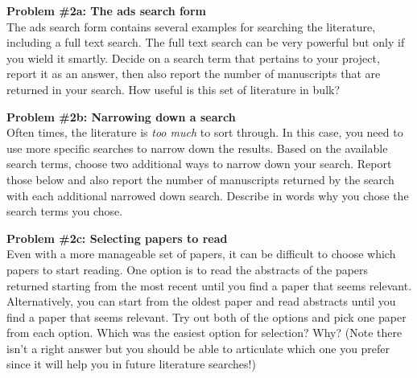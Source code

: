 \documentclass[11pt, a4paper]{article}
\begin{document}
 \vspace{10pt}
 \noindent \textbf{Problem \#2a: The ads search form}\\
 \noindent The ads search form contains several examples for searching the
 literature, including a full text search. The full text search can be very
 powerful but only if you wield it smartly. Decide on a search term that
 pertains to your project, report it as an answer, then also report the number
 of manuscripts that are returned in your search. How useful is this set of
 literature in bulk?

 \vspace{10pt}
 \noindent \textbf{Problem \#2b: Narrowing down a search}\\
 \noindent Often times, the literature is \emph{too much} to sort through. In
 this case, you need to use more specific searches to narrow down the results.
 Based on the available search terms, choose two additional ways to narrow down
 your search. Report those below and also report the number of manuscripts
 returned by the search with each additional narrowed down search. Describe in
 words why you chose the search terms you chose. 

 \vspace{10pt}
 \noindent \textbf{Problem \#2c: Selecting papers to read}\\
 \noindent Even with a more manageable set of papers, it can be difficult to
 choose which papers to start reading. One option is to read the abstracts of
 the papers returned starting from the most recent until you find a paper that
 seems relevant. Alternatively, you can start from the oldest paper and read
 abstracts until you find a paper that seems relevant. Try out both of the
 options and pick one paper from each option. Which was the easiest option for
 selection? Why? (Note there isn't a right answer but you should be able to
 articulate which one you prefer since it will help you in future literature
 searches!) 
\end{document}

